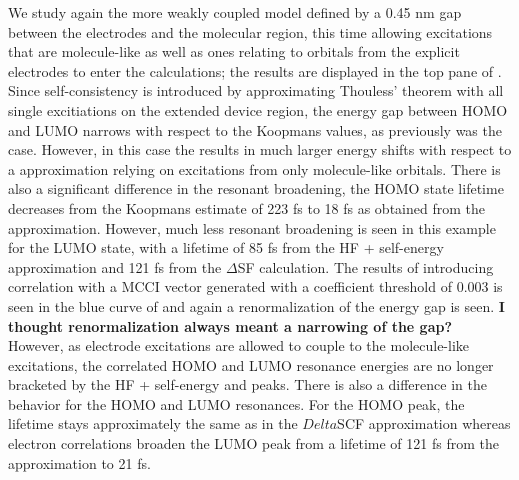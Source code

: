 We study again the more weakly coupled model defined by a 0.45 nm gap
between the electrodes and the molecular region, this time allowing
excitations that are molecule-like as well as ones relating to orbitals
from the explicit electrodes to enter the calculations;
the results are displayed in the top pane of . 
Since self-consistency is introduced by approximating Thouless' theorem
with all single excitiations on the extended device region, the energy gap
between HOMO and LUMO narrows with respect to the Koopmans values, as
previously was the case. However, in this case the \dscf results
in much larger energy shifts with respect to a \dscf approximation
relying on excitations from only molecule-like orbitals. There is also a
significant difference in the resonant broadening, the HOMO state lifetime
decreases from the Koopmans estimate of 223 fs to 18 fs as obtained from
the \dscf approximation. 
However, much less resonant broadening is seen in this example for the
LUMO state, with a lifetime of 85 fs from the HF + self-energy approximation
and 121 fs from the $\Delta$SF calculation. The results of introducing
correlation with a MCCI vector generated with a coefficient threshold of
0.003 is seen in the blue curve of  and again a
renormalization of the energy gap is seen.
{\bf I thought renormalization always meant a narrowing of the gap?}
However, as electrode excitations are allowed to couple to the
molecule-like excitations, the correlated HOMO and LUMO resonance energies
are no longer bracketed by the HF + self-energy and \dscf peaks.
There is also a difference in the behavior for the HOMO and LUMO resonances.
For the HOMO peak, the lifetime stays approximately the same as in the
$Delta$SCF approximation whereas electron correlations broaden the LUMO
peak from a lifetime of 121 fs from the \dscf approximation to 21
fs. 

